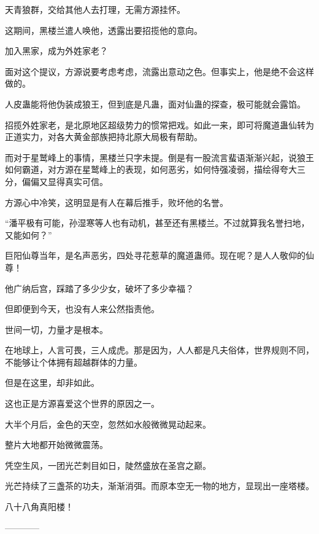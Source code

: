 \begin{this_body}
天青狼群，交给其他人去打理，无需方源挂怀。

这期间，黑楼兰遣人唤他，透露出要招揽他的意向。

加入黑家，成为外姓家老？

面对这个提议，方源说要考虑考虑，流露出意动之色。但事实上，他是绝不会这样做的。

人皮蛊能将他伪装成狼王，但到底是凡蛊，面对仙蛊的探查，极可能就会露馅。

招揽外姓家老，是北原地区超级势力的惯常把戏。如此一来，即可将魔道蛊仙转为正道实力，对各大黄金部族把持北原大局极有帮助。

而对于星鹫峰上的事情，黑楼兰只字未提。倒是有一股流言蜚语渐渐兴起，说狼王如何霸道，对方源在星鹫峰上的表现，如何恶劣，如何恃强凌弱，描绘得夸大三分，偏偏又显得真实可信。

方源心中冷笑，这明显是有人在幕后推手，败坏他的名誉。

“潘平极有可能，孙湿寒等人也有动机，甚至还有黑楼兰。不过就算我名誉扫地，又能如何？”

巨阳仙尊当年，是名声恶劣，四处寻花惹草的魔道蛊师。现在呢？是人人敬仰的仙尊！

他广纳后宫，踩踏了多少少女，破坏了多少幸福？

但即便到今天，也没有人来公然指责他。

世间一切，力量才是根本。

在地球上，人言可畏，三人成虎。那是因为，人人都是凡夫俗体，世界规则不同，不能够让个体拥有超越群体的力量。

但是在这里，却非如此。

这也正是方源喜爱这个世界的原因之一。

大半个月后，金色的天空，忽然如水般微微晃动起来。

整片大地都开始微微震荡。

凭空生风，一团光芒刺目如日，陡然盛放在圣宫之巅。

光芒持续了三盏茶的功夫，渐渐消弭。而原本空无一物的地方，显现出一座塔楼。

八十八角真阳楼！

------------

\end{this_body}

